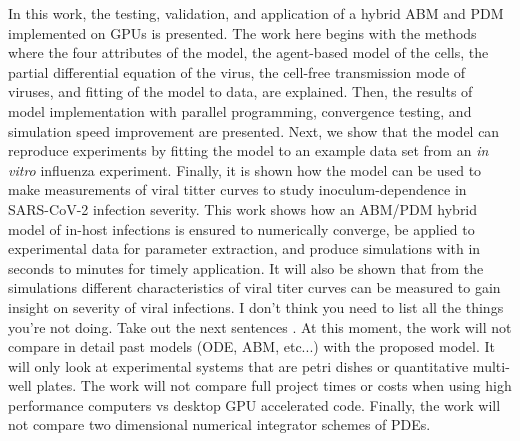 In this work, the testing, validation, and application of a hybrid ABM and PDM implemented on GPUs is presented. The work here begins with the methods where the four attributes of the model, the agent-based model of the cells, the partial differential equation of the virus, the cell-free transmission mode of viruses, and fitting of the model to data, are explained.  Then, the results of model implementation with parallel programming, convergence testing, and simulation speed improvement are presented. Next, we show that the model can reproduce experiments by fitting the model to an example data set from an \emph{in vitro} influenza experiment. Finally, it is shown how the model can be used to make measurements of viral titter curves to study inoculum-dependence in SARS-CoV-2 infection severity. This work shows how an ABM/PDM hybrid model of in-host infections is ensured to numerically converge, be applied to experimental data for parameter extraction, and produce simulations with in seconds to minutes for timely application. It will also be shown that from the simulations different characteristics of viral titer curves can be measured to gain insight on severity of viral infections. \color{red} I don't think you need to list all the things you're not doing. Take out the next sentences \color{black}. At this moment, the work will not compare in detail past models (ODE, ABM, etc...) with the proposed model. It will only look at experimental systems that are petri dishes or quantitative multi-well plates. The work will not compare full project times or costs when using high performance computers vs desktop GPU accelerated code. Finally, the work will not compare two dimensional numerical integrator schemes of PDEs.





